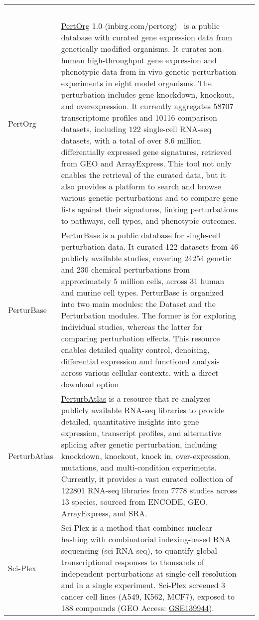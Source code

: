 \begin{newpdflayout}{210mm}{297mm}
\begin{center}
\begin{longtable}{@{} p{} >{\raggedright\arraybackslash}p{} p{} @{}}
  ~\cite{RN102} \\
PertOrg &
  \href{http://www.inbirg.com/pertorg/home}{PertOrg} 1.0 (inbirg.com/pertorg)~\cite{RN87} is a public database with curated gene expression data from genetically modified organisms. It curates non-human high-throughput gene expression and phenotypic data from in vivo genetic perturbation experiments in eight model organisms. The perturbation includes gene knockdown, knockout, and overexpression. It currently aggregates 58707 transcriptome profiles and 10116 comparison datasets, including 122 single-cell RNA-seq datasets, with a total of over 8.6 million differentially expressed gene signatures, retrieved from GEO and ArrayExpress. This tool not only enables the retrieval of the curated data, but it also provides a platform to search and browse various genetic perturbations and to compare gene lists against their signatures, linking perturbations to pathways, cell types, and phenotypic outcomes. &
  ~\cite{RN85} \\
PerturBase &
  \href{http://www.perturbase.cn/}{PerturBase} is a public database for single-cell perturbation data. It curated 122 datasets from 46 publicly available studies, covering 24254 genetic and 230 chemical perturbations from approximately 5 million cells, across 31 human and murine cell types. PerturBase is organized into two main modules: the Dataset and the Perturbation modules. The former is for exploring individual studies, whereas the latter for comparing perturbation effects. This resource enables detailed quality control, denoising, differential expression and functional analysis across various cellular contexts, with a direct download option &
  ~\cite{RN97} \\
PerturbAtlas &
  \href{https://perturbatlas.kratoss.site/#/}{PerturbAtlas} is a resource that re-analyzes publicly available RNA-seq libraries to provide detailed, quantitative insights into gene expression, transcript profiles, and alternative splicing after genetic perturbation, including knockdown, knockout, knock in, over-expression, mutations, and multi-condition experiments. Currently, it provides a vast curated collection of 122801 RNA-seq libraries from 7778 studies across 13 species, sourced from ENCODE, GEO, ArrayExpress, and SRA. &
  ~\cite{RN129} \\
Sci-Plex &
  Sci-Plex is a method that combines nuclear hashing with combinatorial indexing-based RNA sequencing (sci-RNA-seq), to quantify global transcriptional responses to thousands of independent perturbations at single-cell resolution and in a single experiment. Sci-Plex screened 3 cancer cell lines (A549, K562, MCF7), exposed to 188 compounds (GEO Access: \href{https://www.ncbi.nlm.nih.gov/geo/query/acc.cgi?acc=GSE139944}{GSE139944}). &

\end{longtable}
\end{center}
\end{newpdflayout}
